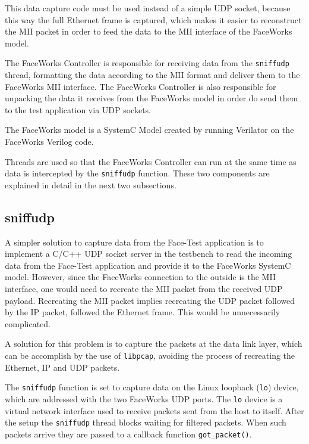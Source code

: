 \documentclass[defaultstyle,10pt,master,Helvetica]{thesis}
\begin{document}
This data capture code must be used instead of a simple UDP socket, because this way the full Ethernet frame is captured, which makes it easier to reconstruct the MII packet in order to feed the data to the MII interface of the FaceWorks model.

The FaceWorks Controller is responsible for receiving data from the \texttt{sniffudp} thread, formatting the data according to the MII format and deliver them to the FaceWorks \ac{MII} interface. The FaceWorks Controller is also responsible for unpacking the data it receives from the FaceWorks model in order do send them to the test application via UDP sockets.

The FaceWorks model is a SystemC Model created by running Verilator on the FaceWorks Verilog code.

Threads are used so that the FaceWorks Controller can run at the same time as data is intercepted by the {\tt sniffudp} function. These two components are explained in detail in the next two subsections.


\subsection{sniffudp}

A simpler solution to capture data from the Face-Test application is to implement a C/C++ \ac{UDP} socket server in the testbench to read the incoming data from the Face-Test application and provide it to the FaceWorks SystemC model. However, since the FaceWorks connection to the outside is the \ac{MII} interface, one would need to recreate the MII packet from the received \ac{UDP} payload. Recreating the MII packet implies recreating the UDP packet followed by the \ac{IP} packet, followed the Ethernet frame. This would be unnecessarily complicated.

A solution for this problem is to capture the packets at the data link layer, which can be accomplish by the use of \texttt{libpcap}, avoiding the process of recreating the Ethernet, \ac{IP} and \ac{UDP} packets.

The \texttt{sniffudp} function is set to capture data on the Linux loopback ({\tt lo}) device, which are addressed with the two FaceWorks \ac{UDP} ports. The {\tt lo} device is a virtual network interface used to receive packets sent from the host to itself. After the setup the \texttt{sniffudp} thread blocks waiting for filtered packets. When such packets arrive they are passed to a callback function \texttt{got\_packet()}.
\end{document}
